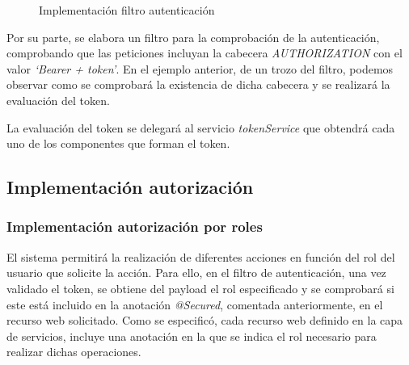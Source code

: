 \begin{figure}[H]
\centering
{}
\caption{Implementación filtro autenticación}
\end{figure}

Por su parte, se elabora un filtro para la comprobación de la autenticación, comprobando que las peticiones incluyan la cabecera \textit{AUTHORIZATION} con el valor \textit{`Bearer + token'}. En el ejemplo anterior, de un trozo del filtro, podemos observar como se comprobará la existencia de dicha cabecera y se realizará la evaluación del token.

La evaluación del token se delegará al servicio \textit{tokenService} que obtendrá cada uno de los componentes que forman el token.


\subsection{Implementación autorización}
\subsubsection*{Implementación autorización por roles}
El sistema permitirá la realización de diferentes acciones en función del rol del usuario que solicite la acción. Para ello, en el filtro de autenticación, una vez validado el token, se obtiene del payload el rol especificado y se comprobará si este está incluido en la anotación \textit{@Secured}, comentada anteriormente, en el recurso web solicitado. Como se especificó, cada recurso web definido en la capa de servicios, incluye una anotación en la que se indica el rol necesario para realizar dichas operaciones.

